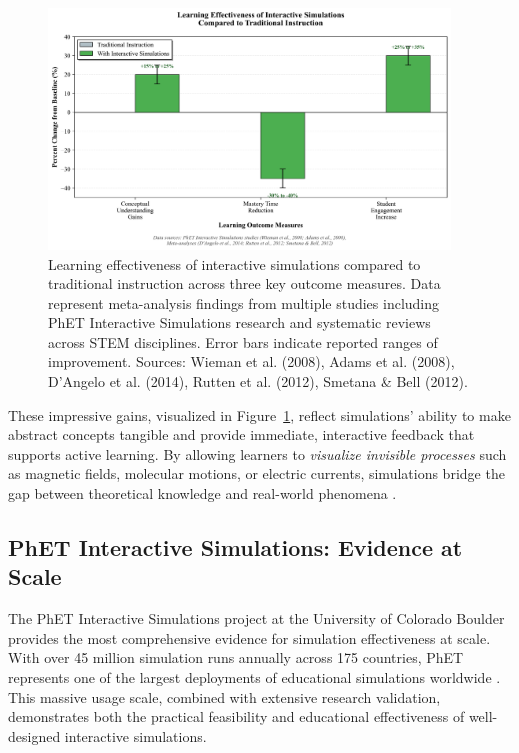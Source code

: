 \begin{figure}[htbp]
\centering
\includegraphics[width=0.95\textwidth]{figures/effectiveness-chart.png}
\caption{Learning effectiveness of interactive simulations compared to traditional instruction across three key outcome measures. Data represent meta-analysis findings from multiple studies including PhET Interactive Simulations research and systematic reviews across STEM disciplines. Error bars indicate reported ranges of improvement. Sources: Wieman et al. (2008), Adams et al. (2008), D'Angelo et al. (2014), Rutten et al. (2012), Smetana \& Bell (2012).}
\label{fig:effectiveness}
\end{figure}

These impressive gains, visualized in Figure~\ref{fig:effectiveness}, reflect simulations' ability to make abstract concepts tangible and provide immediate, interactive feedback that supports active learning. By allowing learners to \textit{visualize invisible processes} such as magnetic fields, molecular motions, or electric currents, simulations bridge the gap between theoretical knowledge and real-world phenomena \cite{phet2023}.

\subsection{PhET Interactive Simulations: Evidence at Scale}

The PhET Interactive Simulations project at the University of Colorado Boulder provides the most comprehensive evidence for simulation effectiveness at scale. With over 45 million simulation runs annually across 175 countries, PhET represents one of the largest deployments of educational simulations worldwide \cite{phet2023}. This massive usage scale, combined with extensive research validation, demonstrates both the practical feasibility and educational effectiveness of well-designed interactive simulations.

